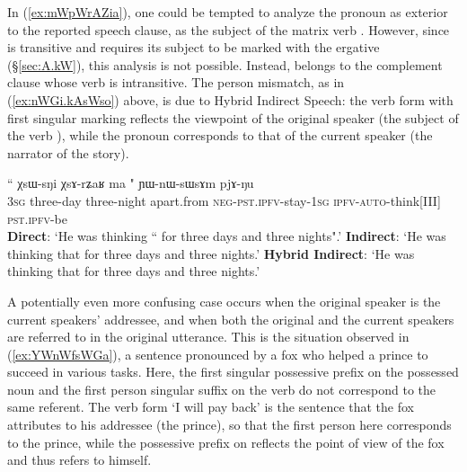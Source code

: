 In (\ref{ex:mWpWrAZia}), one could be tempted to analyze the pronoun  as exterior to the reported speech clause, as the subject of the matrix verb . However, since  is transitive and requires its subject to be marked with the ergative (§\ref{sec:A.kW}), this analysis is not possible. Instead,   belongs to the complement clause whose verb  is intransitive. The person mismatch, as in (\ref{ex:nWGi.kAsWso}) above, is due to Hybrid Indirect Speech: the verb form  with first singular marking reflects the viewpoint of the original speaker (the subject of the verb ), while the pronoun  corresponds to that of the current speaker (the narrator of the story). 
  
\begin{exe}
\ex \label{ex:mWpWrAZia}
\gll   `` χsɯ-sŋi χsɤ-rʑaʁ ma " ɲɯ-nɯ-sɯsɤm pjɤ-ŋu \\
 \textsc{3sg} three-day  three-night apart.from \textsc{neg}-\textsc{pst}.\textsc{ipfv}-stay-\textsc{1sg} \textsc{ipfv}-\textsc{auto}-think[III] \textsc{pst}.\textsc{ipfv}-be \\
\glt    \textbf{Direct}: `He was thinking `` for three days and three nights".'
\glt    \textbf{Indirect}: `He was thinking that  for three days and three nights.'
\glt  \textbf{Hybrid Indirect}: `He was thinking that   for three days and three nights.' 
\end{exe}

 

A potentially even more confusing case occurs when the original speaker is the current speakers' addressee, and when both the original and the current speakers are referred to in the original utterance. This is the situation observed in (\ref{ex:YWnWfsWGa}), a sentence pronounced by a fox who helped a prince to succeed in various tasks. Here,  the first singular possessive prefix  on the possessed noun  and the first person singular suffix  on the verb  do not correspond to the same referent. The verb form  `I will pay back' is the sentence that the fox attributes to his addressee (the prince), so that the first person here corresponds to the prince, while the possessive prefix on  reflects the point of view of the fox and thus refers to himself.

